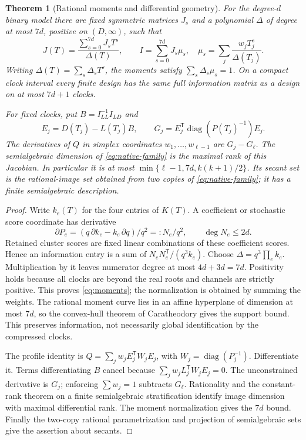 \documentclass[11pt,reqno]{amsart}
\numberwithin{equation}{section}
\newtheorem{theorem}{Theorem}[section]
\theoremstyle{definition}
\theoremstyle{remark}
\begin{document}
\begin{theorem}[Rational moments and differential geometry]\label{thm:moments}
For the degree-$d$ binary model there are fixed symmetric matrices $J_s$ and a polynomial $\Delta$ of degree at most $7d$, positive on $(D,\infty)$, such that
\begin{equation}\label{eq:moments}
 J(T)=\frac{\sum_{s=0}^{7d}J_sT^s}{\Delta(T)},\qquad
 I=\sum_{s=0}^{7d}J_s\mu_s,
 \quad\mu_s=\sum_j\frac{w_jT_j^s}{\Delta(T_j)}.
\end{equation}
Writing $\Delta(T)=\sum_s\Delta_sT^s$, the moments satisfy $\sum_s\Delta_s\mu_s=1$. On a compact clock interval every finite design has the same full information matrix as a design on at most $7d+1$ clocks.

For fixed clocks, put $B=I_{LL}^{-1}I_{LD}$ and
\begin{equation}\label{eq:design-derivative}
 E_j=D(T_j)-L(T_j)B,\qquad
 G_j=E_j^{\mathsf T}\operatorname{diag}(P(T_j)^{-1})E_j.
\end{equation}
The derivatives of $Q$ in simplex coordinates $w_1,\ldots,w_{\ell-1}$ are $G_j-G_\ell$. The semialgebraic dimension of \eqref{eq:native-family} is the maximal rank of this Jacobian. In particular it is at most $\min\{\ell-1,7d,k(k+1)/2\}$. Its secant set is the rational-image set obtained from two copies of \eqref{eq:native-family}; it has a finite semialgebraic description.
\end{theorem}
\begin{proof}
Write $k_e(T)$ for the four entries of $K(T)$. A coefficient or stochastic score coordinate has derivative
\[
 \partial P_e=(q\,\partial k_e-k_e\,\partial q)/q^2=:N_e/q^2,
 \qquad \deg N_e\le2d.
\]
Retained cluster scores are fixed linear combinations of these coefficient scores. Hence an information entry is a sum of $N_eN_e^{\mathsf T}/(q^3k_e)$. Choose $\Delta=q^3\prod_e k_e$. Multiplication by it leaves numerator degree at most $4d+3d=7d$. Positivity holds because all clocks are beyond the real roots and channels are strictly positive. This proves \eqref{eq:moments}; the normalization is obtained by summing the weights. The rational moment curve lies in an affine hyperplane of dimension at most $7d$, so the convex-hull theorem of Caratheodory gives the support bound. This preserves information, not necessarily global identification by the compressed clocks.

The profile identity is $Q=\sum_j w_jE_j^{\mathsf T}W_jE_j$, with $W_j=\operatorname{diag}(P_j^{-1})$. Differentiate it. Terms differentiating $B$ cancel because
$\sum_j w_jL_j^{\mathsf T}W_jE_j=0$. The unconstrained derivative is $G_j$; enforcing $\sum w_j=1$ subtracts $G_\ell$. Rationality and the constant-rank theorem on a finite semialgebraic stratification identify image dimension with maximal differential rank. The moment normalization gives the $7d$ bound. Finally the two-copy rational parametrization and projection of semialgebraic sets give the assertion about secants.
\end{proof}
\end{document}
